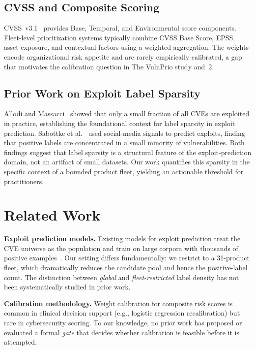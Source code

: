 \documentclass[conference]{IEEEtran}
\begin{document}
\subsection{CVSS and Composite Scoring}

CVSS~v3.1~\cite{first_cvss_v31} provides Base, Temporal, and Environmental
score components. Fleet-level prioritization systems typically combine CVSS
Base Score, EPSS, asset exposure, and contextual factors using a weighted
aggregation. The weights encode organizational risk appetite and are rarely
empirically calibrated, a gap that motivates the calibration question in
The VulnPrio study and~2.

\subsection{Prior Work on Exploit Label Sparsity}

Allodi and Massacci~\cite{allodi2014comparing} showed that only a small
fraction of all CVEs are exploited in practice, establishing the foundational
context for label sparsity in exploit prediction. Sabottke et
al.~\cite{sabottke2015vulnerability} used social-media signals to predict
exploits, finding that positive labels are concentrated in a small minority of
vulnerabilities. Both findings suggest that label sparsity is a structural
feature of the exploit-prediction domain, not an artifact of small datasets.
Our work quantifies this sparsity in the specific context of a bounded product
fleet, yielding an actionable threshold for practitioners.

\section{Related Work}
\label{sec:related}

\textbf{Exploit prediction models.} Existing models for exploit prediction
treat the CVE universe as the population and train on large corpora with
thousands of positive examples~\cite{sabottke2015vulnerability,
jacobs2021epss}. Our setting differs fundamentally: we restrict to a
31-product fleet, which dramatically reduces the candidate pool and hence
the positive-label count. The distinction between \emph{global} and
\emph{fleet-restricted} label density has not been systematically studied
in prior work.

\textbf{Calibration methodology.} Weight calibration for composite risk
scores is common in clinical decision support (e.g., logistic regression
recalibration) but rare in cybersecurity scoring. To our knowledge, no
prior work has proposed or evaluated a formal \emph{gate} that decides
whether calibration is feasible before it is attempted.
\end{document}
